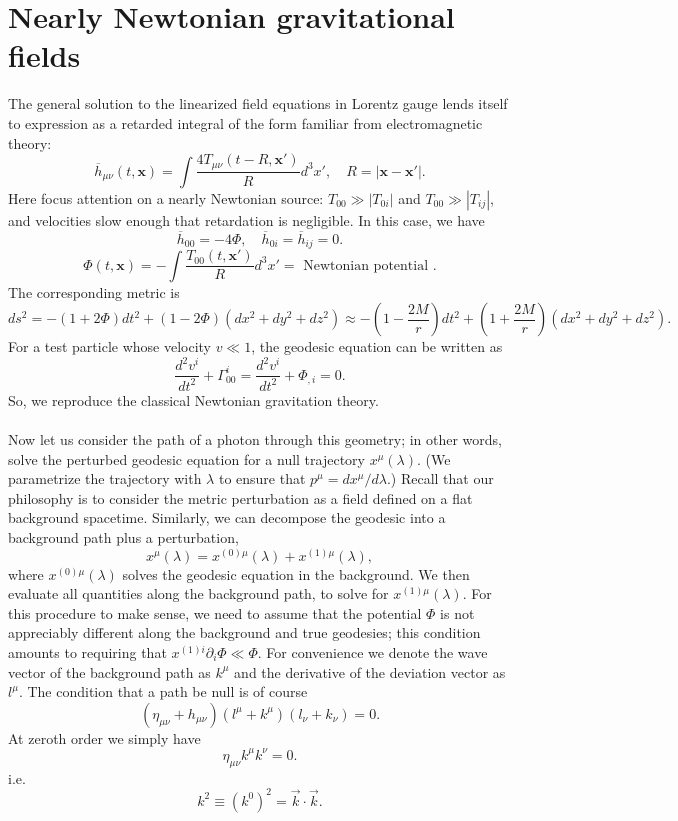 \section{Nearly Newtonian gravitational fields}
The general solution to the linearized field equations in Lorentz gauge lends itself to expression as a retarded integral of the form familiar from electromagnetic theory:
\[\overline{h}_{\mu\nu}(t,\bm{x}) = \int \frac{4T_{\mu\nu}(t-R,\bm{x}')}{R} d^3x' , \quad R = |\bm{x}-\bm{x}'|.\]
Here focus attention on a nearly Newtonian source: $T_{00} \gg |T_{0i}|$ and $T_{00} \gg |T_{ij}|$, and velocities
slow enough that retardation is negligible. In this case, we have
\[\overline{h}_{00} = -4\Phi , \quad \overline{h}_{0i} = \overline{h}_{ij} = 0.\]
\[\Phi(t,\bm{x}) = -\int \frac{T_{00}(t,\bm{x}')}{R} d^3x' = \mbox{ Newtonian potential }.\]
The corresponding metric is
\[ds^2 = -(1+2\Phi)dt^2 + (1-2\Phi)(dx^2 + dy^2 + dz^2) \approx -(1-\frac{2M}{r})dt^2 + (1+\frac{2M}{r})(dx^2 + dy^2 + dz^2).\]
For a test particle whose velocity $v \ll 1$, the geodesic equation can be written as
\[\frac{d^2 v^i}{dt^2} + \Gamma^{i}_{00} = \frac{d^2 v^i}{dt^2} + \Phi_{,i} = 0.\]
So, we reproduce the classical Newtonian gravitation theory.
\\ \\
Now let us consider the path of a photon through
this geometry; in other words, solve the perturbed geodesic equation for a null trajectory $x^{\mu}(\lambda)$. (We parametrize the trajectory with $\lambda$ to ensure that $p^{\mu} = dx^{\mu}/d\lambda$.)
Recall that our philosophy is to consider the metric perturbation as a field defined on a flat background spacetime. 
Similarly, we can decompose the geodesic into a background path plus a perturbation,
\[x^{\mu}(\lambda) = x^{(0)\mu}(\lambda) + x^{(1)\mu}(\lambda),\]
where $x^{(0)\mu}(\lambda)$ solves the geodesic equation in the background. 
We then evaluate all quantities along the background path, to solve for $x^{(1)\mu}(\lambda)$. 
For this procedure to make sense, we need to assume that the potential $\Phi$ is not appreciably different along the background and true geodesies;
this condition amounts to requiring that $x^{(1)i}\partial_{i}\Phi \ll \Phi$. 
For convenience we denote the wave vector of the background path as $k^{\mu}$ and the derivative of the deviation vector as $l^{\mu}$. The condition that a path be null is of course
\[(\eta_{\mu\nu} + h_{\mu\nu})(l^{\mu}+k^{\mu})(l_{\nu} + k_{\nu}) = 0.\]
At zeroth order we simply have
\[\eta_{\mu\nu} k^{\mu} k^{\nu} = 0.\]
i.e.
\[k^2 \equiv (k^0)^2 = \vec{k}\cdot\vec{k}.\]

